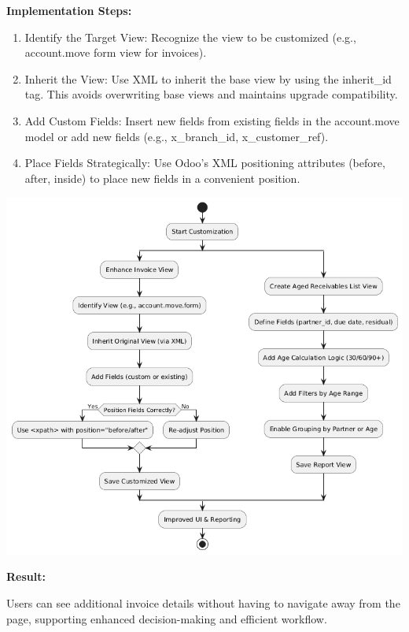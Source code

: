 \documentclass[11pt,a4paper]{article}
\begin{document}
\begin{enumerate}
\begin{minipage}{0.5\textwidth}
    \textbf{Implementation Steps:}
    \begin{enumerate}
        \item Identify the Target View: Recognize the view to be customized 
        (e.g., account.move form view for invoices).
        \item Inherit the View: Use XML to inherit the base view by using the inherit\_id tag. This avoids overwriting base views and maintains upgrade compatibility.
        \item Add Custom Fields: Insert new fields from existing fields in the account.move model or add new fields (e.g., x\_branch\_id, x\_customer\_ref).
        \item Place Fields Strategically: Use Odoo's XML positioning attributes (before, after, inside) to place new fields in a convenient position.
    \end{enumerate}
\end{minipage}%
\hfill
\begin{minipage}{0.45\textwidth}
    \centering
    \includegraphics[width=\linewidth]{diagram/Customization_of_views&action.png}
\end{minipage} 
    \medskip

    \textbf{Result:}

    Users can see additional invoice details without having to navigate away from the page, supporting enhanced decision-making and efficient workflow.


\end{enumerate}
\end{document}
